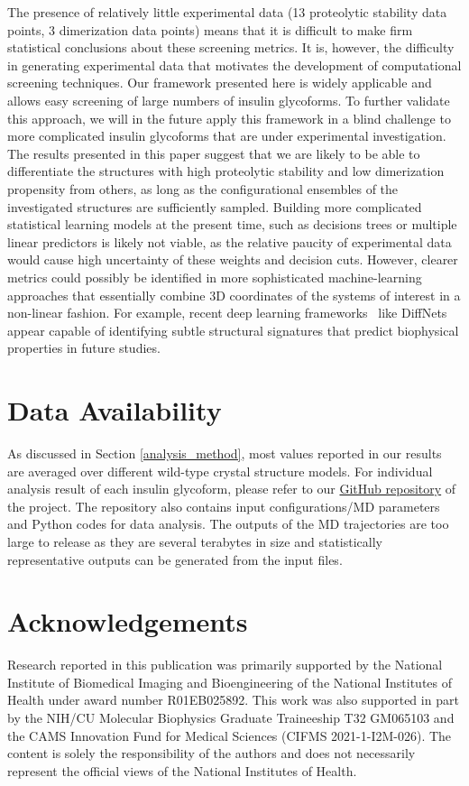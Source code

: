 \documentclass[9pt]{elife}
\begin{document}
The presence of relatively little experimental data (13 proteolytic stability data points, 3 dimerization data points) means that it is difficult to make firm statistical conclusions about these screening metrics.  It is, however, the difficulty in generating experimental data that motivates the development of computational screening techniques.  Our framework presented here is widely applicable and allows easy screening of large numbers of insulin glycoforms. To further validate this approach, we will in the future apply this framework in a blind challenge to more complicated insulin glycoforms that are under experimental investigation. The results presented in this paper suggest that we are likely to be able to differentiate the structures with high proteolytic stability and low dimerization propensity from others, as long as the configurational ensembles of the investigated structures are sufficiently sampled. Building more complicated statistical learning models at the present time, such as decisions trees or multiple linear predictors is likely not viable, as the relative paucity of experimental data would cause high uncertainty of these weights and decision cuts. However, clearer metrics could possibly be identified in more sophisticated machine-learning approaches that essentially combine 3D coordinates of the systems of interest in a non-linear fashion. For example, recent deep learning frameworks~\cite{ward2021deep} like DiffNets appear capable of identifying subtle structural signatures that predict biophysical properties in future studies.



\section{Data Availability}
As discussed in Section \ref{analysis_method}, most values reported in our results are averaged over different wild-type crystal structure models. For individual analysis result of each insulin glycoform, please refer to our \href{https://github.com/shirtsgroup/Glycoinsulin_project}{GitHub repository} of the project. The repository also contains input configurations/MD parameters and Python codes for data analysis. The outputs of the MD trajectories are too large to release as they are several terabytes in size and statistically representative outputs can be generated from the input files.   
\section{Acknowledgements}
Research reported in this publication was primarily supported by the National Institute of Biomedical Imaging and Bioengineering of the National Institutes of Health under award number R01EB025892. This work was also supported in part by the NIH/CU Molecular Biophysics Graduate Traineeship T32 GM065103 and the CAMS Innovation Fund for Medical Sciences (CIFMS 2021-1-I2M-026). The content is solely the responsibility of the authors and does not necessarily represent the official views of the National Institutes of Health.
\end{document}
